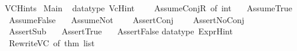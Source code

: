 %
\begin{isabellebody}%
%
%
\isadelimtheory
%
\endisadelimtheory
%
\isatagtheory
{}\isamarkupfalse%
\ VCHints\isanewline
{}\ Main\isanewline
{}%
\endisatagtheory
{\isafoldtheory}%
%
\isadelimtheory
\isanewline
%
\endisadelimtheory
%
\isadelimML
\isanewline
%
\endisadelimML
%
\isatagML
{}\isamarkupfalse%
\ {\isacartoucheopen}\isanewline
datatype\ VcHint\ {\isacharequal}{\kern0pt}\ \isanewline
\ \ AssumeConjR\ of\ int\ {\isacharbar}{\kern0pt}\isanewline
\ \ AssumeTrue\ {\isacharbar}{\kern0pt}\isanewline
\ \ AssumeFalse\ {\isacharbar}{\kern0pt}\isanewline
\ \ AssumeNot\ {\isacharbar}{\kern0pt}\ \isanewline
\ \ AssertConj\ {\isacharbar}{\kern0pt}\ \isanewline
\ \ AssertNoConj\ {\isacharbar}{\kern0pt}\ \isanewline
\ \ AssertSub\ {\isacharbar}{\kern0pt}\isanewline
\ \ AssertTrue\ {\isacharbar}{\kern0pt}\isanewline
\ \ AssertFalse\isanewline
\isanewline
datatype\ ExprHint\ {\isacharequal}{\kern0pt}\isanewline
\ \ RewriteVC\ of\ {\isacharparenleft}{\kern0pt}thm\ list{\isacharparenright}{\kern0pt}\isanewline
{\isacartoucheclose}%
\endisatagML
{\isafoldML}%
%
\isadelimML
\isanewline
%
\endisadelimML
%
\isadelimtheory
\isanewline
%
\endisadelimtheory
%
\isatagtheory
{}\isamarkupfalse%
%
\endisatagtheory
{\isafoldtheory}%
%
\isadelimtheory
%
\endisadelimtheory
%
\end{isabellebody}%
\endinput
